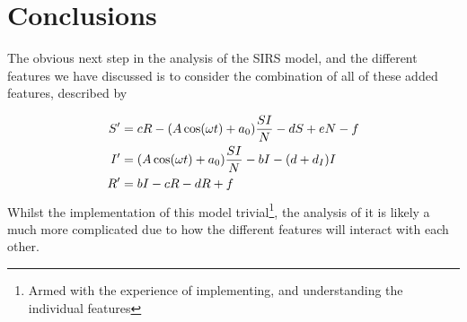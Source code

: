 \documentclass[10pt,showpacs,preprintnumbers,amsmath,amssymb,nofootinbib,aps,prl,twocolumn,groupedaddress,superscriptaddress,showkeys]{revtex4-1}
\begin{document}
\section{Conclusions}

  The obvious next step in the analysis of the SIRS model, and the different features we have discussed is to consider the combination of all of these added features, described by

  \begin{align}
     \begin{split}
        S' &= cR - \qty(A\cos(\omega t) + a_0)\frac{SI}{N} - dS + eN - f \\
        I' &= \qty(A\cos(\omega t)+a_0)\frac{SI}{N} - bI  - (d + d_I)I \\
        R' &= bI - cR - dR + f
     \end{split}
  \end{align} 
   Whilst the implementation of this model trivial\footnote{Armed with the experience of implementing, and understanding the individual features}, the analysis of it is likely a much more complicated due to how the different features will interact with each other. 


\end{document}
